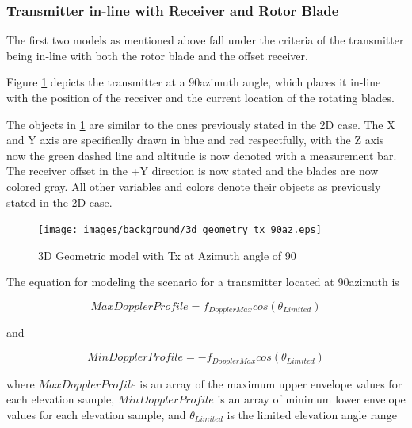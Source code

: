 \subsubsection{Transmitter in-line with Receiver and Rotor Blade}
The first two models as mentioned above fall under the criteria of the transmitter being in-line with both the rotor blade and the offset receiver. 

Figure \ref{fig:3D_model_90az} depicts the transmitter at a 90\textdegree \space azimuth angle, which places it in-line with the position of the receiver and the current location of the rotating blades. 

The objects in \ref{fig:3D_model_90az}  are similar to the ones previously stated in the 2D case. The X and Y axis are specifically drawn in blue and red respectfully, with the Z axis now the green dashed line and altitude is now denoted with a measurement bar. The receiver offset in the +Y direction is now stated and the blades are now colored gray. All other variables and colors denote their objects as previously stated in the 2D case. 

\begin{figure}
	\begin{center}
		\texttt{[image: images/background/3d\_geometry\_tx\_90az.eps]}
		\caption{3D Geometric model with Tx at Azimuth angle of 90\textdegree}
		\label{fig:3D_model_90az}
	\end{center}
\end{figure}

The equation for modeling the scenario for a transmitter located at 90\textdegree \space azimuth is

\begin{equation}
	MaxDopplerProfile = f_{DopplerMax}cos(\theta_{Limited})
	\label{eq:theory_90_upper}
\end{equation}

and

\begin{equation}
	MinDopplerProfile = -f_{DopplerMax}cos(\theta_{Limited})
	\label{eq:theory_90_lower}
\end{equation}

where $MaxDopplerProfile$ is an array of the maximum upper envelope values for each elevation sample, $MinDopplerProfile$ is an array of minimum lower envelope values for each elevation sample, and $\theta_{Limited}$ is the limited elevation angle range

